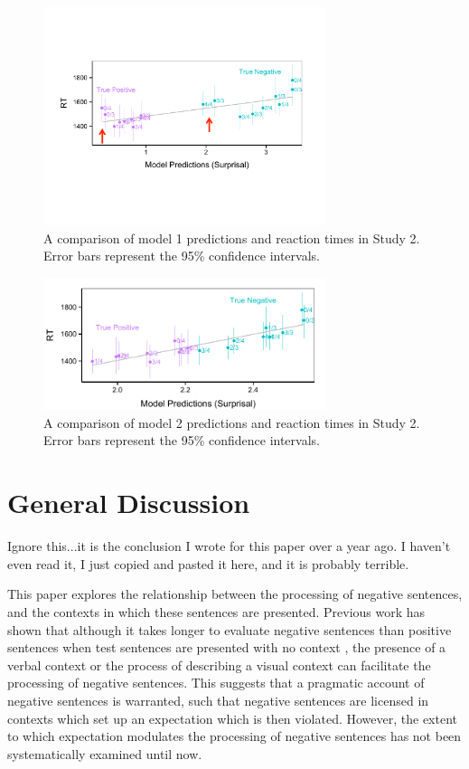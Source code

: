 \documentclass[10pt,letterpaper]{article}
\begin{document}
\begin{figure}
\begin{center} 
\includegraphics[width=3.25in]{figures/model1_comparison.pdf}
\caption{\label{fig:addition_subs} A comparison of model 1 predictions and reaction times in Study 2.  Error bars represent the 95\% confidence intervals.}
\end{center} 
\end{figure}

\begin{figure}
\begin{center} 
\includegraphics[width=3.25in]{figures/model2_comparison.pdf}
\caption{\label{fig:addition_subs} A comparison of model 2 predictions and reaction times in Study 2.  Error bars represent the 95\% confidence intervals.}
\end{center} 
\end{figure}


\section{General Discussion}
Ignore this...it is the conclusion I wrote for this paper over a year ago.  I haven't even read it, I just copied and pasted it here, and it is probably terrible.  

This paper explores the relationship between the processing of negative sentences, and the contexts in which these sentences are presented.  Previous work has shown that although it takes longer to evaluate negative sentences than positive sentences when test sentences are presented with no context \cite{carpenter1975, just1971, just1976, hclark1972}, the presence of a verbal context \cite{dale2011, glenberg1999, ludtke2006} or the process of describing a visual context \cite{wason1965} can facilitate the processing of negative sentences.  This suggests that a pragmatic account of negative sentences is warranted, such that negative sentences are licensed in contexts which set up an expectation which is then violated.  However, the extent to which expectation modulates the processing of negative sentences has not been systematically examined until now.  
\end{document}
